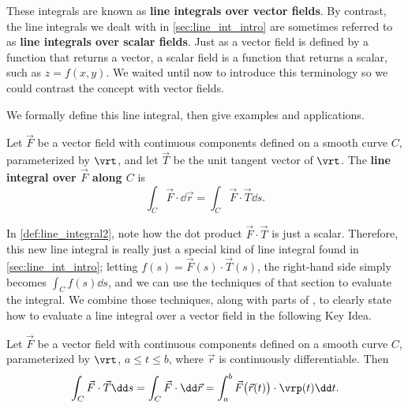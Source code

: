 These integrals are known as \textbf{line integrals over vector fields}. By contrast, the line integrals we dealt with in \autoref{sec:line_int_intro} are sometimes referred to as \textbf{line integrals over scalar fields}. Just as a vector field is defined by a function that returns a vector, a scalar field is a function that returns a scalar, such as $z = f(x,y)$. We waited until now to introduce this terminology so we could contrast the concept with vector fields. 

We formally define this line integral, then give examples and applications.

\begin{definition}\label{def:line_integral2}%
Let $\vec F$ be a vector field with continuous components defined on a smooth curve $C$, parameterized by $\vrt$, and let $\vec T$ be the unit tangent vector of $\vrt$. The \textbf{line integral over $\vec F$ along $C$} is
\[\int_C \vec F\cdot\dd\vec r = \int_C \vec F\cdot\vec T\dd s.\]
\end{definition}


In \autoref{def:line_integral2}, note how the dot product $\vec F \cdot \vec T$ is just a scalar. %
Therefore, this new line integral is really just a special kind of line integral found in \autoref{sec:line_int_intro}; letting $f(s) = \vec F(s)\cdot \vec T(s)$, the right-hand side simply becomes $\int_C f(s)\dd s$, and we can use the techniques of that section to evaluate the integral. We combine those techniques, along with parts of , to clearly state how to evaluate a line integral over a vector field in the following Key Idea. 

\begin{keyidea}\label{idea:line2}%
Let $\vec F$ be a vector field with continuous components defined on a smooth curve $C$, parameterized by $\vrt$, $a\leq t\leq b$, where $\vec r$ is continuously differentiable. Then
	\[
	\int_C\vec F\cdot\vec T\dd s = \int_C \vec F\cdot\dd\vec r
	=\int_a^b \vec F\bigl(\vec r(t)\bigr) \cdot \vrp(t)\dd t.
	\]
\end{keyidea}

